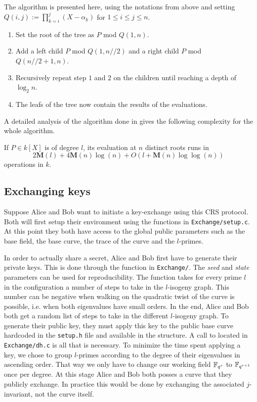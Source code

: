 \documentclass[../main.tex]{subfilesubs}
\begin{document}
The algorithm is presented here, using the notations from above and setting $Q(i, j) :=\prod_{k=i}^j (X-\alpha_k)$ for $1\leq i\leq j\leq n$.
\begin{enumerate}
	\item Set the root of the tree as $P$ mod $Q(1, n)$.
	\item Add a left child $P$ mod $Q(1, n//2)$ and a right child $P$ mod $Q(n//2 + 1, n)$.
	\item Recursively repeat step $1$ and $2$ on the children until reaching a depth of $\log_2n$.
	\item The leafs of the tree now contain the results of the evaluations.
\end{enumerate}
A detailed analysis of the algorithm done in \cite{} gives the following complexity for the whole algorithm.
\begin{lemma}
	If $P\in k[X]$ is of degree $l$, its evaluation at $n$ distinct roots runs in
	\[
		2\mathbf{M}(l) + 4\mathbf{M}(n)\log(n) + O(l + \mathbf{M}(n)\log\log(n))
	\]
operations in $k$.
\end{lemma}



\subsection{Exchanging keys}
Suppose Alice and Bob want to initiate a key-exchange using this CRS protocol.
Both will first setup their environment using the functions in \texttt{Exchange/setup.c}.
At this point they both have access to the global public parameters such as the base field, the base curve, the trace of the curve and the $l$-primes.

In order to actually share a secret, Alice and Bob first have to generate their private keys.
This is done through the  function in \texttt{Exchange/}.
The \textit{seed} and \textit{state} parameters can be used for reproducibility.
The function takes for every prime $l$ in the configuration a number of steps to take in the $l$-isogeny graph.
This number can be negative when walking on the quadratic twist of the curve is possible, i.e. when both eigenvalues have small orders.
In the end, Alice and Bob both get a random list of steps to take in the different $l$-isogeny graph.
To generate their public key, they must apply this key to the public base curve hardcoded in the \texttt{setup.h} file and available in the  structure.
A call to  located in \texttt{Exchange/dh.c} is all that is necessary.
To minimize the time spent applying a key, we chose to group $l$-primes according to the degree of their eigenvalues in ascending order.
That way we only have to change our working field $\mathbb{F}_{q^r}$ to $\mathbb{F}_{q^{r+1}}$ once per degree.
At this stage Alice and Bob both posses a curve that they publicly exchange.
In practice this would be done by exchanging the associated $j$-invariant, not the curve itself.
\end{document}

